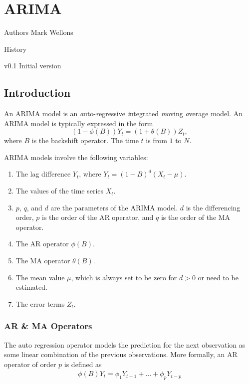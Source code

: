 
\chapter[ARIMA]{ARIMA}
\begin{moduleinfo}
\item[Authors] {Mark Wellons}
\item[History]
	\begin{modulehistory}
    		\item[v0.1] Initial version
	\end{modulehistory}
\end{moduleinfo}

\section{Introduction}

An ARIMA model is an {\it a}uto-{\it r}egressive {\it i}ntegrated {\it
  m}oving {\it a}verage model.  An ARIMA model is typically expressed
in the form  
\begin{equation}
(1 - \phi(B)) Y_t  = (1 + \theta(B)) Z_t,
\end{equation}
where $B$ is the backshift operator. The time $t$ is from $1$ to $N$.

ARIMA models involve the following variables:
\begin{enumerate}
   \item The lag difference $Y_{t}$, where  $Y_{t} = (1-B)^{d}(X_{t} - \mu)$.  
    \item The values of the time series $X_t$.
    \item $p$, $q$, and $d$ are the parameters of the ARIMA model.
      $d$ is the differencing order, $p$ is the order of the AR
      operator, and $q$ is the order of the MA operator.   
    \item The AR operator $\phi(B)$. 
    \item The MA operator $\theta(B)$.
    \item The mean value $\mu$, which is always set to be zero for
      $d>0$ or need to be estimated. 
    \item The error terms $Z_t$.  
\end{enumerate}

\subsection{AR \& MA Operators}
The  auto regression operator models the prediction for the next
observation  as some linear combination of the previous observations.
More formally, an AR operator of order $p$ is defined as  
\begin{align}
\phi(B) Y_t= \phi_1 Y_{t-1}   + \dots +  \phi_{p} Y_{t-p}
\end{align}

